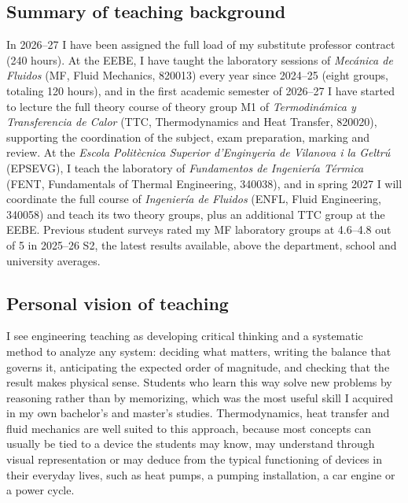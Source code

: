 \documentclass[11pt]{article}
\begin{document}
\subsection{Summary of teaching background}
In 2026--27 I have been assigned the full load of my substitute professor contract (240 hours). 
At the EEBE, I have taught the laboratory sessions of \textit{Mec\'anica de Fluidos} (MF, Fluid Mechanics, 820013) every year since 2024--25 (eight groups, totaling 120 hours), and in the first academic semester of 2026--27 I have started to lecture the full theory course of theory group M1 of \textit{Termodin\'amica y Transferencia de Calor} (TTC, Thermodynamics and Heat Transfer, 820020), supporting the coordination of the subject, exam preparation, marking and review. 
At the \textit{Escola Politècnica Superior d'Enginyeria de Vilanova i la Geltrú} (EPSEVG), I teach the laboratory of \textit{Fundamentos de Ingenier\'ia T\'ermica}
(FENT, Fundamentals of Thermal Engineering, 340038), and in spring 2027 I will coordinate the full course of \textit{Ingenier\'ia de Fluidos} (ENFL, Fluid Engineering, 340058) and teach its two theory groups, plus an additional TTC group at the EEBE. 
Previous student surveys rated my MF laboratory groups at 4.6--4.8 out of 5 in 2025--26 S2, the latest results available, above the department, school and
university averages.

\subsection{Personal vision of teaching}\label{sec:vision}

I see engineering teaching as developing critical thinking and a systematic method to analyze any system: deciding what matters, writing the balance that governs it, anticipating the expected order of magnitude, and checking that the result makes physical sense. 
Students who learn this way solve new problems by reasoning rather than by memorizing, which was the most useful skill I acquired in my own bachelor's and master's studies. 
Thermodynamics, heat transfer and fluid mechanics are well suited to this approach, because most concepts can usually be tied to a device the students may know, may understand through visual representation or may deduce from the typical functioning of devices in their everyday lives, such as heat pumps, a pumping installation, a car engine or a power cycle.
\end{document}
